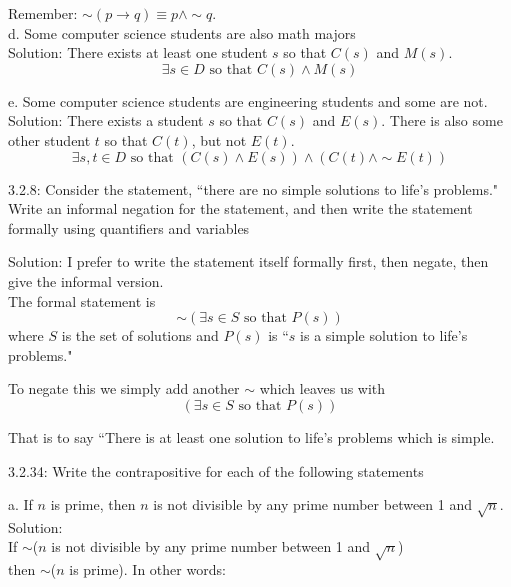 \documentclass[16 pt]{amsart}
\theoremstyle{definition}
\theoremstyle{remark}
\numberwithin{equation}{subsection}
\begin{document}
Remember: $\sim(p\rightarrow q) \equiv p\wedge \sim q$.\\



d. Some computer science students are also math majors\\

Solution: There exists at least one student $s$ so that $C(s)$ and $M(s)$.
\[
\exists s\in D \text{ so that } C(s)\wedge M(s)
\]


e. Some computer science students are engineering students and some are not.\\

Solution: There exists a student $s$ so that $C(s)$ and $E(s)$.  There is also some other student $t$ so that $C(t)$, but not $E(t)$.
\[
\exists s,t \in D \text{ so that } (C(s)\wedge E(s))\wedge(C(t)\wedge \sim E(t))
\]

\newpage

3.2.8: Consider the statement, ``there are no simple solutions to life's problems." Write an informal negation for the statement, and then write the statement formally using quantifiers and variables

\vspace{1in}

Solution: I prefer to write the statement itself formally first, then negate, then give the informal version.\\

The formal statement is
\[
\sim (\exists s\in S \text{ so that } P(s))
\]
where $S$ is the set of solutions and $P(s)$ is ``$s$ is a simple solution to life's problems."

To negate this we simply add another $\sim$ which leaves us with
\[
(\exists s\in S \text{ so that } P(s))
\]

That is to say ``There is at least one solution to life's problems which is simple.

\newpage

3.2.34: Write the contrapositive for each of the following statements

a. If $n$ is prime, then $n$ is not divisible by any prime number between 1 and $\sqrt{n}$.\\

Solution:\\

If $\sim$($n$ is not divisible by any prime number between 1 and $\sqrt{n}$)\\ 
then $\sim$($n$ is prime).  In other words:
\end{document}
